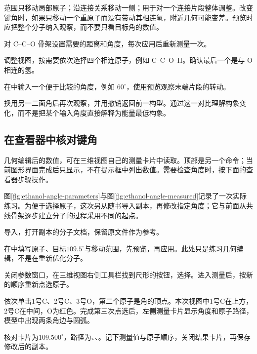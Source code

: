 范围只移动局部原子；沿连接关系移动一侧；用于对一个连接片段整体调整。改变键角时，如果只移动一个重原子而没有带动其相连氢，附近几何可能变差。预览时应把整个分子纳入观察，而不要只看目标角的数值。

\begin{steps}
  \item 对 C--C--O 骨架设置需要的距离和角度，每次应用后重新测量一次。
  \item 调整视图，按需要依次选择四个相连原子，例如 C--C--O--H。确认最后一个是与 O 相连的氢。
  \item 在中输入一个便于比较的角度，例如 $60^\circ$，使用预览观察末端片段的转动。
  \item 换用另一二面角后再次观察，并用撤销返回前一构型。通过这一对比理解构象变化，而不是把某个输入角度直接解释为能量最低构象。
\end{steps}

\subsection{在查看器中核对键角}

几何编辑后的数值，可在三维视图自己的测量卡片中读取。顶部是另一个命令；当前图形界面完成后只显示，不在提示框中列出数值。需要检查角度时，按下面的查看器步骤操作。

图\ref{fig:ethanol-angle-parameters}与图\ref{fig:ethanol-angle-measured}记录了一次实际练习。为便于选择原子，这次另从随书\mbox{}导入副本，再修改指定角度；它与前面从共线骨架逐步建立分子的过程采用不同的起点。

\begin{steps}
  \item 导入\mbox{}，打开副本的分子文档，保留原文件作为参考。
  \item 在中填写原子、目标$109.5^\circ$与移动范围，先预览，再应用。此处只是练习几何编辑，不是在重新优化分子。
\end{steps}



\begin{steps}[resume]
  \item 关闭参数窗口，在三维视图右侧工具栏找到尺形的按钮，选择。进入测量后，按新的顺序重新点选原子。
  \item 依次单击1号C、2号C、3号O，第二个原子是角的顶点。本次视图中1号C在上方，2号C在中间，O为红色。完成第三次点选后，左侧测量卡片显示角度和原子路径，模型中出现两条角边与圆弧。
  \item 核对卡片为$109.500^\circ$，路径为、、。记下测量值与原子顺序，关闭结果卡片，再保存修改后的副本。
\end{steps}

